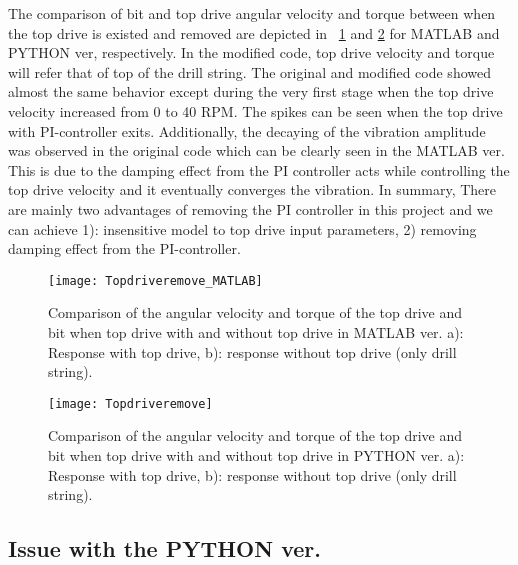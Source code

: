 The comparison of bit and top drive angular velocity and torque between when the top drive is existed and removed are depicted in \figurename~\ref{figure_topdriveremove_MATLAB} and \ref{figure_topdriveremove} for MATLAB and PYTHON ver, respectively. In the modified code, top drive velocity and torque will refer that of top of the drill string. The original and modified code showed almost the same behavior except during the very first stage when the top drive velocity increased from 0 to 40 RPM. The spikes can be seen when the top drive with PI-controller exits. Additionally, the decaying of the vibration amplitude was  observed in the original code which can be clearly seen in the MATLAB ver. This is due to the damping effect from the PI controller acts while controlling the top drive velocity and it eventually converges the vibration. In summary, There are mainly two advantages of removing the PI controller in this project and we can achieve 1): insensitive model to top drive input parameters, 2) removing damping effect from the PI-controller.

\begin{figure}[!hbt]
  \centering
  \texttt{[image: Topdriveremove\_MATLAB]}
  \caption[comparison between with and without top drive: Matlab ver.]{Comparison of the angular velocity and torque of the top drive and bit when top drive with and without top drive in MATLAB ver. a): Response with top drive, b): response without top drive (only drill string).}\label{figure_topdriveremove_MATLAB}
\end{figure}

\begin{figure}[!hbt]
  \centering
  \texttt{[image: Topdriveremove]}
  \caption[comparison between with and without top drive: PYTHON ver.]{Comparison of the angular velocity and torque of the top drive and bit when top drive with and without top drive in PYTHON ver. a): Response with top drive, b): response without top drive (only drill string).}\label{figure_topdriveremove}
\end{figure}

\subsection{Issue with the PYTHON ver.}
%

